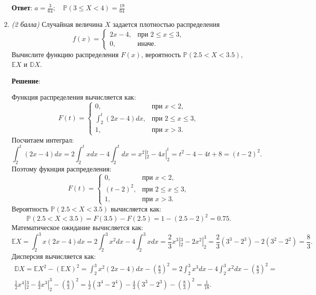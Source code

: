 \documentclass{article}
\begin{document}
\begin{enumerate}
\textbf{Ответ}:
$a = \frac{3}{64}; \quad \mathbb{P}(3\leq X<4) = \frac{19}{64}$

\item \textit{(2 балла)} Случайная величина $X$ задается плотностью распределения
$$f(x)=
\begin{cases}
   2x-4, &\text{при } 2\leq x\leq3,\\
   0, &\text{иначе}.
 \end{cases}$$
Вычислите функцию распределения $F(x)$, вероятность $\mathbb{P}(2.5<X<3.5)$, $\mathbb{E}X$ и $\mathbb{D}X$.

\textbf{Решение}:

Функция распределения вычисляется как:
\begin{equation}
    F(t) = \begin{cases}
        0, &\text{при } x < 2,\\
        \int_{2}^{t}(2x-4)dx, &\text{при } 2\leq x\leq3,\\
        1, &\text{при } x > 3.
    \end{cases}
\end{equation}
Посчитаем интеграл:
\begin{equation}
    \int_{2}^{t}(2x-4)dx = 2\int_{2}^{t}xdx - 4\int_{2}^{t}dx = x^2 |_2^t - 4 x|_2^t = t^2 - 4 - 4t + 8 = (t-2)^2.
\end{equation}
Поэтому фукнция распределения:
\begin{equation}
    F(t) = \begin{cases}
        0, &\text{при } x < 2,\\
        (t-2)^2, &\text{при } 2\leq x\leq3,\\
        1, &\text{при } x > 3.
    \end{cases}
\end{equation}
Вероятность $\mathbb{P}(2.5<X<3.5)$ вычисляется как:
\begin{equation}
    \mathbb{P}(2.5<X<3.5) = F(3.5) - F(2.5) = 1 - (2.5-2)^2 = 0.75.
\end{equation}
Математическое ожидание вычисляется как:
\begin{equation}
    \mathbb{E}X = \int_{2}^{3}x(2x-4)dx = 2\int_{2}^{3}x^2 dx - 4\int_{2}^{3}xdx = \frac{2}{3} x^3|_2^3 - 2 x^2|_2^3 = \frac{2}{3} (3^3-2^3) - 2 (3^2-2^2) = \frac{8}{3}.
\end{equation}
Дисперсия вычисляется как:
\begin{eqnarray}
    \mathbb{D}X = \mathbb{E}X^2 - (\mathbb{E}X)^2 = \int_{2}^{3}x^2(2x-4)dx - \left(\frac{8}{3}\right)^2 = 2\int_{2}^{3}x^3dx - 4\int_{2}^{3}x^2dx - \left(\frac{8}{3}\right)^2 = \\
    \frac{1}{2} x^4|_2^3 - \frac{4}{3} x^3|_2^3 - \left(\frac{8}{3}\right)^2 = \frac{1}{2} (3^4 - 2^4) - \frac{4}{3} (3^3 - 2^3) - \left(\frac{8}{3}\right)^2 = \frac{1}{18}.
\end{eqnarray}


\end{enumerate}
\end{document}
